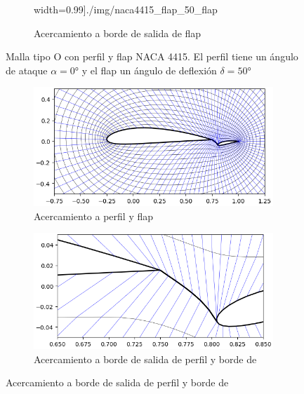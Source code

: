 \documentclass[letterpaper, openright, 12pt]{book}
\begin{document}
\begin{figure}[htbp!]
\begin{subfigure}[b]{0.45\textwidth}
                width=0.99\textwidth]{./img/naca4415_flap_50_flap}
            \caption{Acercamiento a borde de salida de flap}
            \label{fig:naca4415_flap_50_flap}
        \end{subfigure}
        \caption[Malla tjipo O con perfil y flap NACA 4415 a
            $50\si{\degree}$] {Malla tipo O con perfil y flap NACA 4415. El
            perfil tiene un ángulo de ataque $\alpha = 0\si{\degree}$ y el flap
            un ángulo de deflexión $\delta = 50\si{\degree}$}
    \end{figure}


    \begin{figure}[htbp!]
        \centering
        \begin{subfigure}[t]{0.45\textwidth}
            \includegraphics[keepaspectratio,
                width=0.99\textwidth]{./img/naca4415_flap_-10}
            \caption{Acercamiento a perfil y flap}
            \label{fig:naca4415_flap_-10_both}
        \end{subfigure}
        \hfill
        \begin{subfigure}[t]{0.45\textwidth}
            \includegraphics[keepaspectratio,
                width=0.99\textwidth]{./img/naca4415_flap_-10_airfoil}
            \caption{Acercamiento a borde de salida de perfil y borde de
}
\end{subfigure}
\end{figure}
\end{document}
